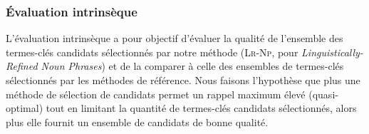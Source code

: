       \subsubsection{Évaluation intrinsèque}
      \label{subsubsec:main:domain_independent_keyphrase_extraction-keyphrase_candidate_selection-evaluation-intrinsic_evaluation}
        L'évaluation intrinsèque a pour objectif d'évaluer la qualité de
        l'ensemble des termes-clés candidats sélectionnés par notre méthode
        (\textsc{Lr-Np}, pour \textit{Linguistically-Refined Noun Phrases}) et
        de la comparer à celle des ensembles de termes-clés sélectionnés par les
        méthodes de référence. Nous faisons l'hypothèse que plus une
        méthode de sélection de candidats permet un rappel maximum élevé
        (quasi-optimal) tout en limitant la quantité de termes-clés candidats
        sélectionnés, alors plus elle fournit un ensemble de candidats de bonne
        qualité.

